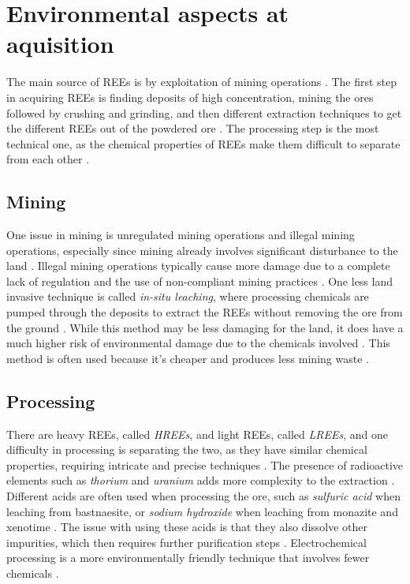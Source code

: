 
\section{Environmental aspects at aquisition}

The main source of REEs is by exploitation of mining operations \cite{REELandscape}. The first step in acquiring REEs is finding deposits of high concentration, mining the ores followed by crushing and grinding, and then different extraction techniques to get the different REEs out of the powdered ore \cite{REELandscape}. The processing step is the most technical one, as the chemical properties of REEs make them difficult to separate from each other \cite{britannica2024}.


\subsection{Mining}

One issue in mining is unregulated mining operations and illegal mining operations, especially since mining already involves significant disturbance to the land \cite{unregulatedMining}. Illegal mining operations typically cause more damage due to a complete lack of regulation and the use of non-compliant mining practices \cite{unregulatedMining}. One less land invasive technique is called \textit{in-situ leaching}, where processing chemicals are pumped through the deposits to extract the REEs without removing the ore from the ground \cite{REELandscape}. While this method may be less damaging for the land, it does have a much higher risk of environmental damage due to the chemicals involved \cite{unregulatedMining}. This method is often used because it's cheaper and produces less mining waste \cite{unregulatedMining}.

\subsection{Processing}

There are heavy REEs, called \textit{HREEs}, and light REEs, called \textit{LREEs}, and one difficulty in processing is separating the two, as they have similar chemical properties, requiring intricate and precise techniques \cite{HREELREE}. The presence of radioactive elements such as \textit{thorium} and \textit{uranium} adds more complexity to the extraction \cite{radioactive}. Different acids are often used when processing the ore, such as \textit{sulfuric acid} when leaching from bastnaesite, or \textit{sodium hydroxide} when leaching from monazite and xenotime \cite{REELandscape}. The issue with using these acids is that they also dissolve other impurities, which then requires further purification steps \cite{radioactive}. Electrochemical processing is a more environmentally friendly technique that involves fewer chemicals \cite{radioactive}.

